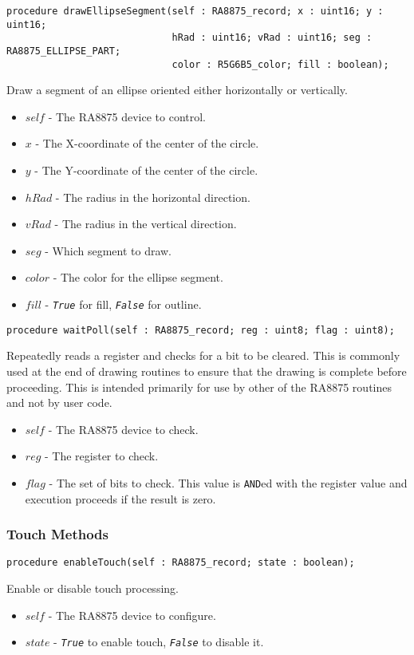 \documentclass[10pt, openany]{book}
\newcommand{\constant}[1]{\emph{\texttt{#1}}}
\newcommand{\keyword}[1]{\texttt{#1}}
\begin{document}
\begin{lstlisting}
procedure drawEllipseSegment(self : RA8875_record; x : uint16; y : uint16;
                             hRad : uint16; vRad : uint16; seg : RA8875_ELLIPSE_PART;
                             color : R5G6B5_color; fill : boolean);
\end{lstlisting}
Draw a segment of an ellipse oriented either horizontally or vertically.
\begin{itemize}
  \item $self$ - The RA8875 device to control.
  \item $x$ - The X-coordinate of the center of the circle.
  \item $y$ - The Y-coordinate of the center of the circle.
  \item $hRad$ - The radius in the horizontal direction.
  \item $vRad$ - The radius in the vertical direction.
  \item $seg$ - Which segment to draw.
  \item $color$ - The color for the ellipse segment.
  \item $fill$ - \constant{True} for fill, \constant{False} for outline.
\end{itemize}

\begin{lstlisting}
procedure waitPoll(self : RA8875_record; reg : uint8; flag : uint8);
\end{lstlisting}
Repeatedly reads a register and checks for a bit to be cleared.  This is commonly used at the end of drawing routines to ensure that the drawing is complete before proceeding.  This is intended primarily for use by other of the RA8875 routines and not by user code.
\begin{itemize}
  \item $self$ - The RA8875 device to check.
  \item $reg$ - The register to check.
  \item $flag$ - The set of bits to check.  This value is \keyword{AND}ed with the register value and execution proceeds if the result is zero.
\end{itemize}

\subsubsection{Touch Methods}
\begin{lstlisting}
procedure enableTouch(self : RA8875_record; state : boolean);
\end{lstlisting}
Enable or disable touch processing.
\begin{itemize}
  \item $self$ - The RA8875 device to configure.
  \item $state$ - \constant{True} to enable touch, \constant{False} to disable it.
\end{itemize}
\end{document}
